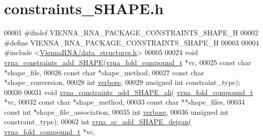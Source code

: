 \hypertarget{constraints___s_h_a_p_e_8h_source}{}\section{constraints\+\_\+\+S\+H\+A\+P\+E.\+h}
\label{constraints___s_h_a_p_e_8h_source}

\begin{DoxyCode}
00001 \textcolor{preprocessor}{#ifndef VIENNA\_RNA\_PACKAGE\_CONSTRAINTS\_SHAPE\_H}
00002 \textcolor{preprocessor}{#define VIENNA\_RNA\_PACKAGE\_CONSTRAINTS\_SHAPE\_H}
00003 
00004 \textcolor{preprocessor}{#include <\mbox{\hyperlink{data__structures_8h}{ViennaRNA/data\_structures.h}}>}
00005 
00024 \textcolor{keywordtype}{void} \mbox{\hyperlink{constraints___s_h_a_p_e_8h_a5006f99ae90398dccd35576bdbc2bfd9}{vrna\_constraints\_add\_SHAPE}}(\mbox{\hyperlink{group__fold__compound_structvrna__fc__s}{vrna\_fold\_compound\_t}} *vc,
00025                                 \textcolor{keyword}{const} \textcolor{keywordtype}{char} *shape\_file,
00026                                 \textcolor{keyword}{const} \textcolor{keywordtype}{char} *shape\_method,
00027                                 \textcolor{keyword}{const} \textcolor{keywordtype}{char} *shape\_conversion,
00028                                 \textcolor{keywordtype}{int} \mbox{\hyperlink{_p_kplex_8h_a0b2caeb4b6f130be43e5a2f0267dd453}{verbose}},
00029                                 \textcolor{keywordtype}{unsigned} \textcolor{keywordtype}{int} constraint\_type);
00030 
00031 \textcolor{keywordtype}{void} \mbox{\hyperlink{constraints___s_h_a_p_e_8h_aa7101297ccc1fa337308e6e436f10a00}{vrna\_constraints\_add\_SHAPE\_ali}}(
      \mbox{\hyperlink{group__fold__compound_structvrna__fc__s}{vrna\_fold\_compound\_t}} *vc,
00032                                     \textcolor{keyword}{const} \textcolor{keywordtype}{char} *shape\_method,
00033                                     \textcolor{keyword}{const} \textcolor{keywordtype}{char} **shape\_files,
00034                                     \textcolor{keyword}{const} \textcolor{keywordtype}{int}  *shape\_file\_association,
00035                                     \textcolor{keywordtype}{int} \mbox{\hyperlink{_p_kplex_8h_a0b2caeb4b6f130be43e5a2f0267dd453}{verbose}},
00036                                     \textcolor{keywordtype}{unsigned} \textcolor{keywordtype}{int} constraint\_type);
00062 \textcolor{keywordtype}{int} \mbox{\hyperlink{group___s_h_a_p_e__reactivities_ga57d612b58e1c61dd6cfcb5a843f8f1b3}{vrna\_sc\_add\_SHAPE\_deigan}}( \mbox{\hyperlink{group__fold__compound_structvrna__fc__s}{vrna\_fold\_compound\_t}} *vc,

\end{DoxyCode}
